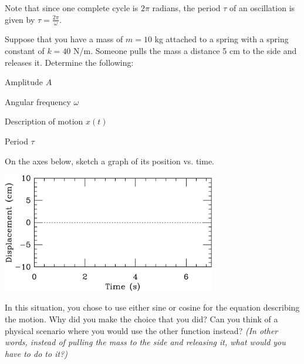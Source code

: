 \documentclass[12pt]{article}
\begin{document}
\newpage

Note that since one complete cycle is $2\pi$ radians, the period $\tau$ of an oscillation is given by $\tau = \frac{2\pi}{\omega}$.

Suppose that you have a mass of $m = 10$ kg attached to a spring with a spring constant of $k = 40$ N/m. Someone pulls the mass a distance 5 cm to the side and releases it. Determine the following:

\bigskip

\begin{minipage}{0.25\textwidth}
	Amplitude $A$
\end{minipage}
\begin{minipage}{0.25\textwidth}
	Angular frequency $\omega$
\end{minipage}
\begin{minipage}{0.35\textwidth}
	Description of motion $x(t)$
\end{minipage}
\begin{minipage}{0.25\textwidth}
	Period $\tau$
\end{minipage}

\vspace{1.5in}

\begin{minipage}{0.5\textwidth}
On the axes below, sketch a graph of its position vs. time.
\bigskip

\includegraphics[width=0.7\textwidth]{blank.pdf}
\end{minipage}
\begin{minipage}{0.5\textwidth}
In this situation, you chose to use either sine or cosine for the equation describing the motion. Why did you make the choice that you did? Can you think of a physical scenario where you would use the other function instead? {\it (In other words, instead of pulling the mass to the side and releasing it, what would you have to do to it?)}
\vspace{2in}

\end{minipage}






 
\end{document}
